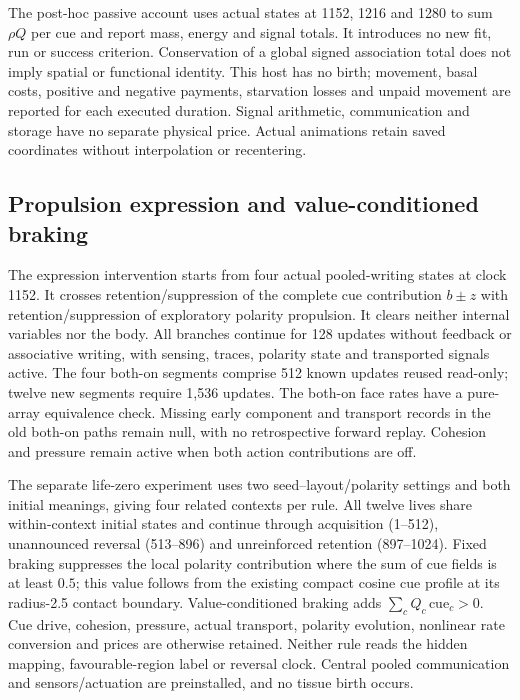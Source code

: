 The post-hoc passive account uses actual states at 1152, 1216 and 1280 to sum $\rho Q$ per cue and report mass, energy and signal totals. It introduces no new fit, run or success criterion. Conservation of a global signed association total does not imply spatial or functional identity. This host has no birth; movement, basal costs, positive and negative payments, starvation losses and unpaid movement are reported for each executed duration. Signal arithmetic, communication and storage have no separate physical price. Actual animations retain saved coordinates without interpolation or recentering.

\subsection*{Propulsion expression and value-conditioned braking}

The expression intervention starts from four actual pooled-writing states at clock 1152. It crosses retention/suppression of the complete cue contribution $b\pm z$ with retention/suppression of exploratory polarity propulsion. It clears neither internal variables nor the body. All branches continue for 128 updates without feedback or associative writing, with sensing, traces, polarity state and transported signals active. The four both-on segments comprise 512 known updates reused read-only; twelve new segments require 1,536 updates. The both-on face rates have a pure-array equivalence check. Missing early component and transport records in the old both-on paths remain null, with no retrospective forward replay. Cohesion and pressure remain active when both action contributions are off.

The separate life-zero experiment uses two seed--layout/polarity settings and both initial meanings, giving four related contexts per rule. All twelve lives share within-context initial states and continue through acquisition (1--512), unannounced reversal (513--896) and unreinforced retention (897--1024). Fixed braking suppresses the local polarity contribution where the sum of cue fields is at least $0.5$; this value follows from the existing compact cosine cue profile at its radius-2.5 contact boundary. Value-conditioned braking adds $\sum_c Q_c\,\mathrm{cue}_c>0$. Cue drive, cohesion, pressure, actual transport, polarity evolution, nonlinear rate conversion and prices are otherwise retained. Neither rule reads the hidden mapping, favourable-region label or reversal clock. Central pooled communication and sensors/actuation are preinstalled, and no tissue birth occurs.

